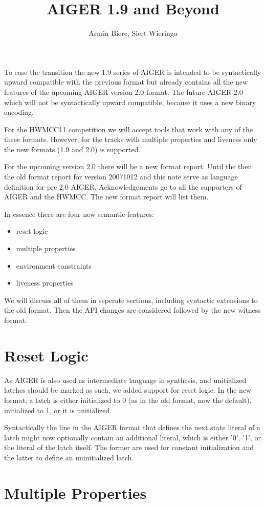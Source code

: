 \documentclass{llncs}
\title{AIGER 1.9 and Beyond}
\author{Armin Biere, Siert Wieringa}
\begin{document}
To ease the transition the new 1.9 series of AIGER is intended to be
syntactically upward compatible with the previous format but already
contains all the new features of the upcoming AIGER version 2.0 format.  The
future AIGER 2.0 which will not be syntactically upward compatible, because
it uses a new binary encoding.  

For the HWMCC11 competition we will accept tools that work with any of
the three formats.  However, for the tracks with multiple properties and 
liveness only the new formats (1.9 and 2.0) is supported.

For the upcoming version 2.0 there will be a new format report. Until the
then the old format report for version 20071012 and this note serve as
language definition for pre 2.0 AIGER.  Acknowledgements go to all the
supporters of AIGER and the HWMCC.  The new format report will list them.

In essence there are four new semantic features:

\begin{itemize}
\item reset logic
\item multiple properties
\item environment constraints
\item liveness properties
\end{itemize}

We will discuss all of them in seperate sections, including syntactic
extensions to the old format.   Then the API changes are considered followed
by the new witness format.

\section{Reset Logic}

As AIGER is also used as intermediate language in synthesis, and unitialized
latches should be marked as such, we added support for reset logic.  In the
new format, a latch is either initialized to 0 (as in the old format, now
the default), initialized to 1, or it is unitialized.

Syntactically the line in the AIGER format that defines the next state
literal of a latch might now optionally contain an additional literal, which
is either '0', '1', or the literal of the latch itself.  The former are used
for constant initialization and the latter to define an uninitialized latch.

\section{Multiple Properties}
\end{document}
